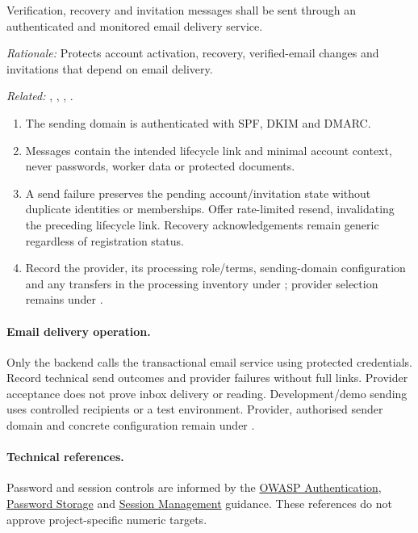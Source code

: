 \label{nfr:SEC-11}
Verification, recovery and invitation messages shall be sent through an authenticated and monitored email delivery service.

\textit{Rationale:} Protects account activation, recovery, verified-email changes and invitations that depend on email delivery.

\textit{Related:} \hyperref[fr:001]{}, \hyperref[fr:005]{}, \hyperref[fr:006]{}, \hyperref[fr:064]{}.
\begin{enumerate}[label=(\alph*),leftmargin=*,itemsep=1pt,topsep=3pt]
\item The sending domain is authenticated with SPF, DKIM and DMARC.
\item Messages contain the intended lifecycle link and minimal account context, never passwords, worker data or protected documents.
\item A send failure preserves the pending account/invitation state without duplicate identities or memberships. Offer rate-limited resend, invalidating the preceding lifecycle link. Recovery acknowledgements remain generic regardless of registration status.
\item Record the provider, its processing role/terms, sending-domain configuration and any transfers in the processing inventory under \hyperref[nfr:PRV-05]{}; provider selection remains under .
\end{enumerate}

\paragraph{Email delivery operation.}
Only the backend calls the transactional email service using protected credentials.
Record technical send outcomes and provider failures without full links. Provider
acceptance does not prove inbox delivery or reading. Development/demo sending uses
controlled recipients or a test environment. Provider, authorised sender domain and
concrete configuration remain under .

\paragraph{Technical references.}
Password and session controls are informed by the
\href{https://cheatsheetseries.owasp.org/cheatsheets/Authentication_Cheat_Sheet.html}{OWASP Authentication},
\href{https://cheatsheetseries.owasp.org/cheatsheets/Password_Storage_Cheat_Sheet.html}{Password Storage}
and \href{https://cheatsheetseries.owasp.org/cheatsheets/Session_Management_Cheat_Sheet.html}{Session Management}
guidance. These references do not approve project-specific numeric targets.

